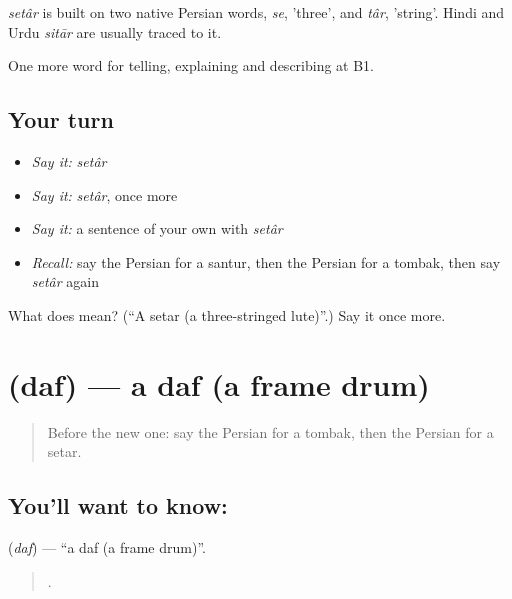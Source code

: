 \begin{cousinweb}
\emph{setâr} is built on two native Persian words, \emph{se}, 'three', and \emph{târ}, 'string'. Hindi and Urdu \emph{sitār} are usually traced to it.
\end{cousinweb}

\begin{grammarlens}[title={What you've built}]
One more word for telling, explaining and describing at B1.
\end{grammarlens}

\subsection*{Your turn}
\begin{itemize}
\raggedright
  \item \emph{Say it:} \emph{setâr}
  \item \emph{Say it:} \emph{setâr}, once more
  \item \emph{Say it:} a sentence of your own with \emph{setâr}
  \item \emph{Recall:} say the Persian for a santur, then the Persian for a tombak, then say \emph{setâr} again
\end{itemize}

\begin{tcolorbox}[breakable,colback=teal!4,colframe=teal!35!black,title={Before you move on}]
What does   mean? (\textquotedblleft{}A setar (a three-stringed lute)\textquotedblright{}.) Say it once more.
\end{tcolorbox}
\section[\texorpdfstring{\fa{دف} (daf)}{دف (daf)}]{ (daf) — a daf (a frame drum)}

\label{lesson:FA-C518-daf}



\begin{quote}
Before the new one: say the Persian for a tombak, then the Persian for a setar.
\end{quote}

\subsection*{You'll want to know: }
\textbf{} (\emph{daf}) — \textquotedblleft{}a daf (a frame drum)\textquotedblright{}.

\begin{quote}
    .
\end{quote}

